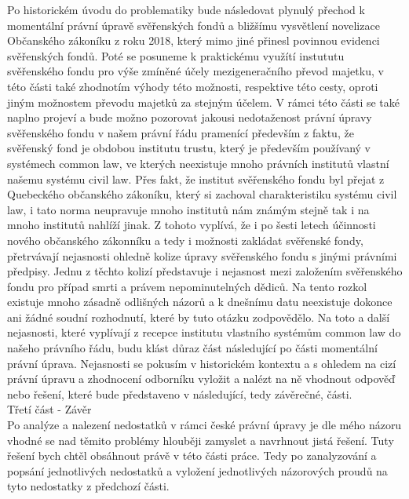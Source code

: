 \documentclass{article}
\begin{document}
Po historickém úvodu do problematiky bude následovat plynulý přechod k momentální právní úpravě svěřenských fondů a bližšímu vysvětlení novelizace Občanského zákoníku z roku 2018, který mimo jiné přinesl povinnou evidenci svěřenských fondů. Poté se posuneme k praktickému využítí instututu svěřenského fondu pro výše zmíněné účely mezigeneračního převod majetku, v této části také zhodnotím výhody této možnosti, respektive této cesty, oproti jiným možnostem převodu majetků za stejným účelem. V rámci této části se také naplno projeví a bude možno pozorovat jakousi nedotaženost právní úpravy svěřenského fondu v našem právní řádu pramenící především z faktu, že svěřenský fond je obdobou institutu trustu, který je především používaný v systémech common law, ve kterých neexistuje mnoho právních institutů vlastní našemu systému civil law. Přes fakt, že institut svěřenského fondu byl přejat z Quebeckého občanského zákoníku, který si zachoval charakteristiku systému civil law, i tato norma neupravuje mnoho institutů nám známým stejně tak i na mnoho institutů nahlíží jinak. Z tohoto vyplívá, že i po šesti letech účinnosti nového občanského zákonníku a tedy i možnosti zakládat svěřenské fondy, přetrvávají nejasnosti ohledně kolize úpravy svěřenského fondu s jinými právními předpisy. Jednu z těchto kolizí představuje i nejasnost mezi založením svěřenského fondu pro případ smrti a právem nepominutelných dědiců. Na tento rozkol existuje mnoho zásadně odlišných názorů a k dnešnímu datu neexistuje dokonce ani žádné soudní rozhodnutí, které by tuto otázku zodpovědělo. Na toto a další nejasnosti, které vyplívají z recepce institutu vlastního systémům common law do našeho právního řádu, budu klást důraz část následující po části momentální právní úprava. Nejasnosti se pokusím v historickém kontextu a s ohledem na cizí právní úpravu a zhodnocení odborníku vyložit a nalézt na ně vhodnout odpověď nebo řešení, které bude představeno v následující, tedy závěrečné, části. \\

{\Large Třetí část - Závěr}\\

Po analýze a nalezení nedostatků v rámci české právní úpravy je dle mého názoru vhodné se nad těmito problémy hlouběji zamyslet a navrhnout jistá řešení. Tuty řešení bych chtěl obsáhnout právě v této části práce. Tedy po zanalyzování a popsání jednotlivých nedostatků a vyložení jednotlivých názorových proudů na tyto nedostatky z předchozí části.

\newpage
\end{document}
